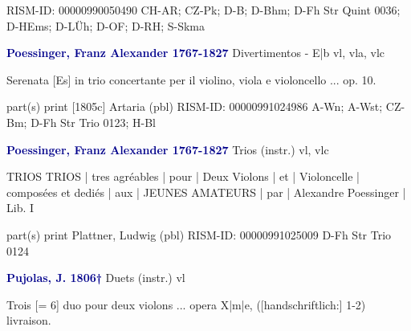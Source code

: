 \documentclass[twocolumn]{book}
\begin{document}
\newline RISM-ID: 00000990050490
\newline CH-AR; CZ-Pk; D-B; D-Bhm; D-Fh  Str Quint 0036; D-HEms; D-LÜh; D-OF; D-RH; S-Skma
\newline \par \vspace{7pt} \textcolor{darkblue}{\textbf{Poessinger, Franz Alexander  1767-1827}}
\newline Divertimentos - E|b
\newline vl, vla, vlc
\newline \begin{itshape}Serenata [Es] in trio concertante per il violino, viola e violoncello ... op. 10.\end{itshape} 
\newline \textcolor{darkblue}{}  part(s)
\newline print  [1805c]
\newline Artaria  (pbl)
\newline RISM-ID: 00000991024986
\newline A-Wn; A-Wst; CZ-Bm; D-Fh  Str Trio 0123; H-Bl
\newline \par \vspace{7pt} \textcolor{darkblue}{\textbf{Poessinger, Franz Alexander  1767-1827}}
\newline Trios (instr.)
 vl, vlc
\newline \begin{itshape}TRIOS TRIOS | tres agréables | pour | Deux Violons | et | Violoncelle | composées et dediés | aux | JEUNES AMATEURS | par | Alexandre Poessinger | Lib. I\end{itshape} 
\newline \textcolor{darkblue}{}  part(s)
\newline print
\newline Plattner, Ludwig  (pbl)
\newline RISM-ID: 00000991025009
\newline D-Fh  Str Trio 0124
\newline \par \vspace{7pt} \textcolor{darkblue}{\textbf{Pujolas, J.  1806†}}
\newline Duets (instr.)
 vl
\newline \begin{itshape}Trois [= 6] duo pour deux violons ... opera X|m|e, ([handschriftlich:] 1-2) livraison.\end{itshape} 
\end{document}
